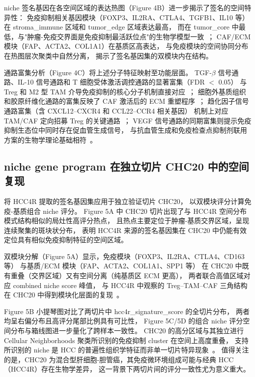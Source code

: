 \documentclass[12pt, a4paper]{ctexart}
\begin{document}
niche 签名基因在各空间区域的表达热图（Figure 4B）进一步揭示了签名的空间特异性：
免疫抑制相关基因模块（FOXP3、IL2RA、CTLA4、TGFB1、IL10 等）
在 stroma\_immune 区域和 tumor\_edge 区域表达最高，
而在 tumor\_core 中最低，与"肿瘤-免疫交界面是免疫抑制最活跃位点"的生物学模型一致~\citep{zheng2017landscape}；
CAF/ECM 模块（FAP、ACTA2、COL1A1）在基质区高表达，
与免疫模块的空间协同分布在热图层次聚类中自然分离，
揭示了签名基因集的双模块内在结构。

通路富集分析（Figure 4C）将上述分子特征映射至功能层面。
TGF-$\beta$ 信号通路、IL-10 信号通路和 T 细胞受体激活调控通路的显著富集（FDR $<$ 0.05）
与 Treg 和 M2 型 TAM 介导免疫抑制的核心分子机制直接对应~\citep{sakaguchi2020regulatory,noy2014tumor}；
细胞外基质组织和胶原纤维化通路的富集反映了 CAF 激活后的 ECM 重塑程序~\citep{kalluri2016biology}；
趋化因子信号通路富集（含 CXCL12--CXCR4 和 CCL22--CCR4 相关基因）
机制上对应 TAM/CAF 定向招募 Treg 的关键通路~\citep{domanska2013targeting,curiel2004specific}；
VEGF 信号通路的同期富集则提示免疫抑制生态位中同时存在促血管生成信号，
与抗血管生成和免疫检查点抑制剂联用方案的生物学理论基础相符~\citep{finn2020atezolizumab}。

\subsection{niche gene program 在独立切片 CHC20 中的空间复现}

将 HCC4R 提取的签名基因集应用于独立验证切片 CHC20，
以双模块评分计算免疫-基质组合 niche 评分。
Figure 5A 中 CHC20 切片出现了与 HCC4R 空间分布模式结构相似的局灶性高评分热点，
且热点主要定位于肿瘤-基质交界区域，呈现连续聚集的斑块状分布，
表明 HCC4R 来源的签名基因集在 CHC20 中仍能有效定位具有相似免疫抑制特征的空间区域。

双模块分解（Figure 5A）显示，免疫模块（FOXP3、IL2RA、CTLA4、CD163 等）
与基质/ECM 模块（FAP、ACTA2、COL1A1、SPP1 等）
在 CHC20 中既有重叠（交界区域）又有空间分离（纯基质区 ECM 更高），
两者联合高值区域对应 combined niche score 峰值，
与 HCC4R 中观察的 Treg--TAM--CAF 三角结构在 CHC20 中得到模块化层面的复现~\citep{kalluri2016biology,sakaguchi2020regulatory}。

Figure 5B 小提琴图对比了两切片中 hcc4r\_signature\_score 的全切片分布，
两者均呈右偏分布且高评分尾部比例具有可比性，
Figure 5C/5D 的组合 niche 评分空间分布与箱线图进一步量化了跨样本一致性。
CHC20 的高分区域与其独立进行 Cellular Neighborhoods 聚类所识别的免疫抑制 cluster 在空间上高度重叠，
支持所识别的 niche 是 HCC 的普遍性组织学特征而非单一切片特异现象~\citep{llovet2021hepatocellular}。
值得关注的是，CHC20 为混合型肝细胞-胆管癌，其免疫微环境组成可能与经典 HCC（HCC4R）存在生物学差异，
这一背景下两切片间的评分一致性尤为意义重大。
\end{document}
